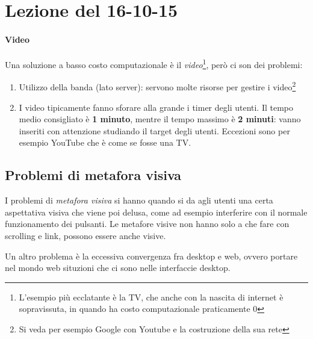 \section{Lezione del 16-10-15}

\paragraph*{Video} Una soluzione a basso costo computazionale \`e il \textit{video}\footnote{L'esempio pi\`u ecclatante \`e la TV, che anche con la nascita di internet \`e sopravissuta, in quando ha costo computazionale praticamente 0}, per\`o ci son dei problemi:
\begin{enumerate}

\item Utilizzo della banda (lato server): servono molte risorse per gestire i video\footnote{Si veda per esempio Google con Youtube e la costruzione della sua rete}

\item I video tipicamente fanno sforare alla grande i timer degli utenti. Il tempo medio consigliato \`e \textbf{1 minuto}, mentre il tempo massimo \`e \textbf{2 minuti}: vanno inseriti con attenzione studiando il target degli utenti. Eccezioni sono per esempio YouTube che \`e come se fosse una TV.

\end{enumerate}

\subsection{Problemi di metafora visiva}

I problemi di \textit{metafora visiva} si hanno quando si da agli utenti una certa aspettativa visiva che viene poi delusa, come ad esempio interferire con il normale funzionamento dei pulsanti.
Le metafore visive non hanno solo a che fare con scrolling e link, possono essere anche visive.

Un altro problema \`e la eccessiva convergenza fra desktop e web, ovvero portare nel mondo web situzioni che ci sono nelle interfaccie desktop.

